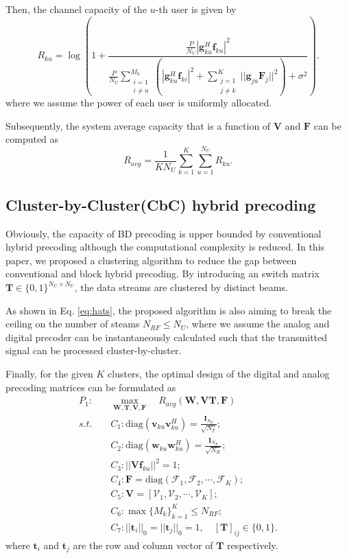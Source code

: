 \documentclass[conference]{IEEEtran}
\begin{document}
Then, the channel capacity of the $u$-th user is given by
\begin{equation}\label{eq:convenR}
R_{ku} = \log\left(1+\frac{\frac{P}{N_U}|{\bm{g}}_{ku}^H \bm{f}_{ku}|^2}{\frac{P}{N_U}\sum_{\substack{i=1 \\ i\neq u}}^{M_k}(|{\bm{g}}_{ku}^H\bm{f}_{ki}|^2+\sum_{\substack{j=1\\j\neq k}}^{K}||\bm{g}_{ju}\bm{F}_j||^2)+\sigma^2}\right).
\end{equation}
where we assume the power of each user is uniformly allocated.

Subsequently, the system average capacity that is a function of ${\bm V}$ and ${\bm F}$ can be computed as
\begin{equation}
R_{avg}=\frac{1}{KN_U}\sum_{k=1}^{K}\sum_{u=1}^{N_U}R_{ku}.
\end{equation}

\subsection{Cluster-by-Cluster(CbC) hybrid precoding}
Obviously, the capacity of BD precoding is upper bounded by conventional hybrid precoding although the computational complexity is reduced. In this paper, we proposed a clustering algorithm to reduce the gap between conventional and block hybrid precoding. By introducing an switch matrix $\bm{T}\in \{0,1\}^{N_U\times N_U}$, the data streams are clustered by distinct beams.

As shown in Eq. \eqref{eq:hats}, the proposed algorithm is also aiming to break the ceiling on the number of steams $N_{RF}\leq N_U$, where we assume the analog and digital precoder can be instantaneously calculated such that the transmitted signal can be processed cluster-by-cluster.

Finally, for the given $K$ clusters, the optimal design of the digital and analog precoding matrices can be formulated as
\begin{align}\label{eq:maxsumrate}
P_1: \quad&\max_{\bm W, \bm T, \bm{V},\bm F}\quad R_{avg}(\bm{W},\bm{VT},\bm{F})\\ \nonumber
s.t. \quad&C_1: \text{diag}(\bm{v}_{ku}\bm{v}_{ku}^H)=\frac{\bm{I}_{N_T}}{\sqrt{N_T}};\\
&C_2: \text{diag}(\bm{w}_{ku}\bm{w}_{ku}^H)=\frac{\bm{I}_{N_{R}}}{\sqrt{N_R}};\nonumber\\
&C_3: ||\bm{Vf}_{ku}||^2=1;\nonumber\\
&C_4: \bm{F} = \text{diag}(\bm{\mathcal{F}}_1, \bm{\mathcal{F}}_2, \cdots, \bm{\mathcal{F}}_{K});\nonumber\\
&C_5: \bm{V} = [\bm{\mathcal{V}}_1, \bm{\mathcal{V}}_2, \cdots, \bm{\mathcal{V}}_K];\nonumber\\
&C_6: \max \{M_k\}_{k=1}^K \leq N_{RF};\nonumber\\
&C_7: ||\bm{t}_{i}||_0=||\bm{t}_{j}||_0=1, \quad [\bm{T}]_{ij}\in\{0,1\}.\nonumber
\end{align}
where $\bm{t}_{i}$ and $\bm{t}_{j}$ are the row and column vector of $\bm{T}$ respectively. 
\end{document}
